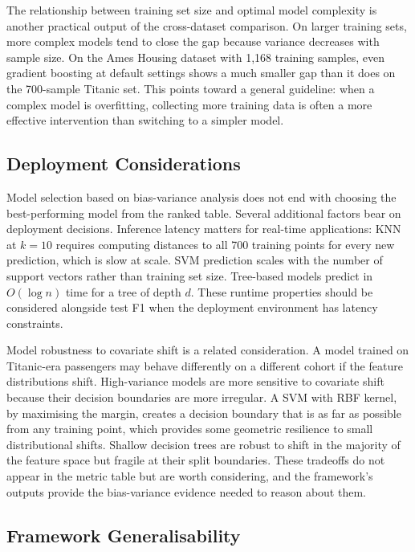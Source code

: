 \documentclass[conference]{IEEEtran}
\begin{document}
The relationship between training set size and optimal model complexity is another practical output of the cross-dataset comparison. On larger training sets, more complex models tend to close the gap because variance decreases with sample size. On the Ames Housing dataset with 1,168 training samples, even gradient boosting at default settings shows a much smaller gap than it does on the 700-sample Titanic set. This points toward a general guideline: when a complex model is overfitting, collecting more training data is often a more effective intervention than switching to a simpler model.

\subsection{Deployment Considerations}

Model selection based on bias-variance analysis does not end with choosing the best-performing model from the ranked table. Several additional factors bear on deployment decisions. Inference latency matters for real-time applications: KNN at $k=10$ requires computing distances to all 700 training points for every new prediction, which is slow at scale. SVM prediction scales with the number of support vectors rather than training set size. Tree-based models predict in $O(\log n)$ time for a tree of depth $d$. These runtime properties should be considered alongside test F1 when the deployment environment has latency constraints.

Model robustness to covariate shift is a related consideration. A model trained on Titanic-era passengers may behave differently on a different cohort if the feature distributions shift. High-variance models are more sensitive to covariate shift because their decision boundaries are more irregular. A SVM with RBF kernel, by maximising the margin, creates a decision boundary that is as far as possible from any training point, which provides some geometric resilience to small distributional shifts. Shallow decision trees are robust to shift in the majority of the feature space but fragile at their split boundaries. These tradeoffs do not appear in the metric table but are worth considering, and the framework's outputs provide the bias-variance evidence needed to reason about them.

\subsection{Framework Generalisability}
\end{document}
